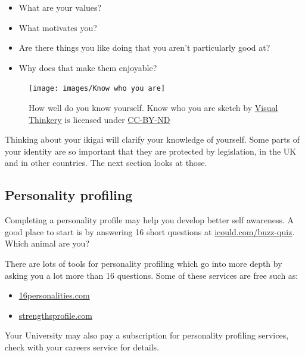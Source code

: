 \documentclass[
]{book}
\providecommand{\tightlist}{%
  \setlength{\itemsep}{0pt}\setlength{\parskip}{0pt}}
\begin{document}
\begin{itemize}
\tightlist
\item
  What are your values?
\item
  What motivates you?
\item
  Are there things you like doing that you aren't particularly good at?
\item
  Why does that make them enjoyable?
\end{itemize}

\begin{figure}

{\centering \texttt{[image: images/Know who you are]} 

}

\caption{How well do you know yourself. Know who you are sketch by \href{https://visualthinkery.com}{Visual Thinkery} is licensed under \href{https://creativecommons.org/licenses/by-nd/4.0/}{CC-BY-ND}}\label{fig:know-fig}
\end{figure}



Thinking about your ikigai will clarify your knowledge of yourself. Some parts of your identity are so important that they are protected by legislation, in the UK and in other countries. The next section looks at those.

\hypertarget{personality}{%
\subsection{Personality profiling}\label{personality}}

Completing a personality profile may help you develop better self awareness. A good place to start is by answering 16 short questions at \href{https://icould.com/buzz-quiz}{icould.com/buzz-quiz}. Which animal are you?

There are lots of tools for personality profiling which go into more depth by asking you a lot more than 16 questions. Some of these services are free such as:

\begin{itemize}
\tightlist
\item
  \href{https://www.16personalities.com}{16personalities.com}
\item
  \href{https://strengthsprofile.com/en-GB/Products/Free}{strengthsprofile.com}
\end{itemize}

Your University may also pay a subscription for personality profiling services, check with your careers service for details.
\end{document}
